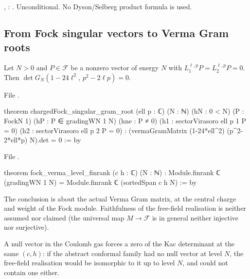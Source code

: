 \begin{status}
\allowbreak{}\allowbreak{}\allowbreak{}\allowbreak{}\allowbreak{},
\allowbreak{}\allowbreak{}\allowbreak{}\allowbreak{}: \lean{[propext, Classical.}\allowbreak{}\allowbreak\lean{sound]}.
Unconditional. No Dyson/Selberg product formula is used.
\end{status}

\subsection{From Fock singular vectors to Verma Gram roots}

\begin{theorem}[Transfer]\label{l06:thm:transfer}
Let $N>0$ and $P\in\mathcal F$ be a nonzero vector of energy $N$ with $L^{\ell,p}_1P = L^{\ell,p}_2P = 0$.
Then $\det G_N(1-24\ell^2,\,p^2-2\ell p) = 0$.
\end{theorem}

File .
\begin{leancode}
theorem chargedFock_singular_gram_root (ell p : ℂ) (N : ℕ) (hN : 0 < N)
    (P : FockN 1) (hP : P ∈ gradingWN 1 N) (hne : P ≠ 0)
    (h1 : sectorVirasoro ell p 1 P = 0) (h2 : sectorVirasoro ell p 2 P = 0) :
    (vermaGramMatrix (1-24*ell^2) (p^2-2*ell*p) N).det = 0 := by
\end{leancode}
File .
\begin{leancode}
theorem fock_verma_level_finrank (c h : ℂ) (N : ℕ) :
    Module.finrank ℂ (gradingWN 1 N) = Module.finrank ℂ (sortedSpan c h N) := by
\end{leancode}

\begin{dictionary}
The conclusion is about the actual Verma Gram matrix, at the central charge and weight of the Fock
module. Faithfulness of the free-field realisation is neither assumed nor claimed (the universal map
$M\to\mathcal F$ is in general neither injective nor surjective).
\end{dictionary}

\begin{physics}
A null vector in the Coulomb gas forces a zero of the Kac determinant at the same $(c,h)$: if the
abstract conformal family had no null vector at level $N$, the free-field realisation would be
isomorphic to it up to level $N$, and could not contain one either.
\end{physics}

